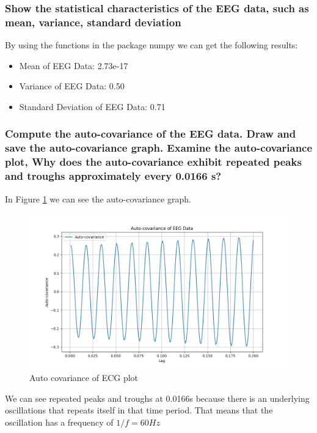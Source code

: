 \documentclass{article}
\begin{document}
\subsubsection{ Show the statistical characteristics of the EEG data, such as mean, variance, standard deviation}
By using the functions in the package numpy we can get the following results:
\begin{itemize}
    \item Mean of EEG Data: 2.73e-17
    \item Variance of EEG Data: 0.50
    \item Standard Deviation of EEG Data: 0.71
\end{itemize}


\subsubsection{Compute the auto-covariance of the EEG data. Draw and save the auto-covariance graph. Examine the auto-covariance plot, Why does the auto-covariance exhibit repeated peaks and troughs approximately every 0.0166 s?}

In Figure \ref{fig:ecgcovariance} we can see the auto-covariance graph.
 \begin{figure}[H]
    \centering \includegraphics[width=0.7\linewidth]{img/ecg2/auto_covariance_plot.png}
    \caption{Auto covariance of ECG plot}
    \label{fig:ecgcovariance}
    \end{figure}
We can see repeated peaks and troughs at 0.0166s because there is an underlying oscillations that repeats itself in that time period. That means that the oscillation has a frequency of $1/f = 60Hz$
\end{document}
